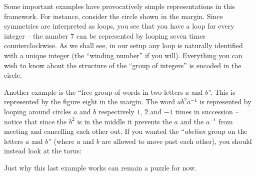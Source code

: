 Some important examples have provocatively simple representations in this framework.  For instance, consider the circle shown in the margin.
Since symmetries are interpreted as loops, you see that you have a loop for every integer -- the number $7$ can be represented by looping seven times counterclockwise.  As we shall see, in our setup any loop is naturally identified with a unique integer (the ``winding number'' if you will).  Everything you can wish to know about the structure of the ``group of integers'' is encoded in the circle.

Another example is the ``free group of words in two letters $a$ and $b$''.  This is represented by the figure eight in the margin.
The word $ab^2a^{-1}$ is represented by looping around circles $a$ and $b$ respectively $1$, $2$ and $-1$ times in succession -- notice that since the $b^2$ is in the middle it prevents the $a$ and the $a^{-1}$ from meeting and cancelling each other out.  If you wanted the ``\emph{abelian} group on the letters $a$ and $b$'' (where $a$ and $b$ are allowed to move past each other), you should instead look at the torus:
\begin{center}
\end{center}
Just why this last example works can remain a puzzle for now.

